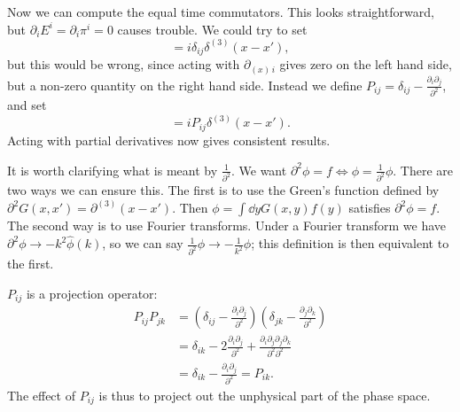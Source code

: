 \documentclass{jknotes} %
\begin{document}
Now we can compute the equal time commutators. This looks straightforward, but \(\partial_iE^i=\partial_i\pi^i=0\) causes trouble. We could try to set
\begin{equation}
    [A_i(x,t),\pi_j(x',t)] = i\delta_{ij}\delta^{(3)}(x-x'),
\end{equation}
but this would be wrong, since acting with \(\partial_{(x)\,i}\) gives zero on the left hand side, but a non-zero quantity on the right hand side. Instead we define \(P_{ij} = \delta_{ij} - \frac{\partial_i\partial_j}{\partial^2}\), and set
\begin{equation}
    [A_i(x,t),\pi_j(x',t)] = iP_{ij}\delta^{(3)}(x-x').
\end{equation}
Acting with partial derivatives now gives consistent results.

It is worth clarifying what is meant by \(\frac{1}{\partial^2}\). We want \(\partial^2\phi=f \iff \phi = \frac{1}{\partial^2}\phi\). There are two ways we can ensure this. The first is to use the Green's function defined by \(\partial^2G(x,x')=\partial^{(3)}(x-x')\). Then \(\phi = \int\dd{y} G(x,y)f(y)\) satisfies \(\partial^2\phi=f\). The second way is to use Fourier transforms. Under a Fourier transform we have \(\partial^2\phi \to -k^2\hat\phi(k)\), so we can say \(\frac{1}{\partial^2}\phi \to -\frac{1}{k^2}\phi\); this definition is then equivalent to the first.

\(P_{ij}\) is a projection operator:
\begin{align}
    P_{ij}P_{jk} &= \left(\delta_{ij}-\frac{\partial_i\partial_j}{\partial^2}\right)\left(\delta_{jk} - \frac{\partial_j\partial_k}{\partial^2}\right) \\
                 &= \delta_{ik} - 2\frac{\partial_i\partial_j}{\partial^2} + \frac{\partial_i\partial_j\partial_j\partial_k}{\partial^2\partial^2} \\
                 &= \delta_{ik} - \frac{\partial_i\partial_j}{\partial^2} = P_{ik}.
\end{align}
The effect of \(P_{ij}\) is thus to project out the unphysical part of the phase space.
\end{document}
